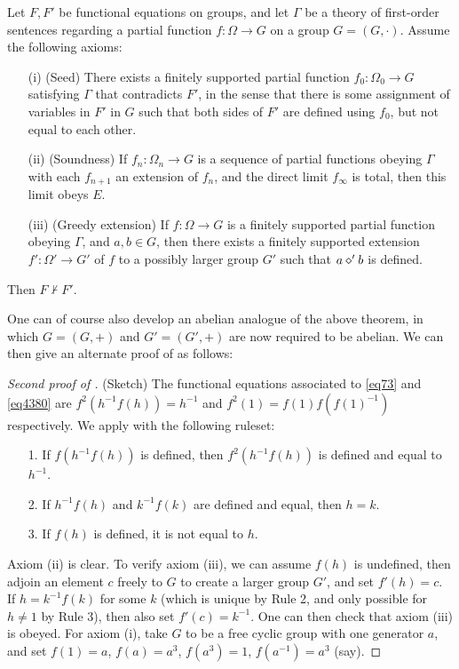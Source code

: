 \begin{theorem}\label{nc-greedy-abstract} Let $F,F'$ be functional equations on groups, and let $\Gamma$ be a theory of first-order sentences regarding a partial function $f \colon \Omega \to G$ on a group $G = (G,\cdot)$.  Assume the following axioms:
  \begin{itemize}
    \item[(i)] (Seed) There exists a finitely supported partial function $f_0 \colon \Omega_0 \to G$ satisfying $\Gamma$ that contradicts $F'$, in the sense that there is some assignment of variables in $F'$ in $G$ such that both sides of $F'$ are defined using $f_0$, but not equal to each other.
    \item[(ii)]  (Soundness)  If $f_n \colon \Omega_n \to G$ is a sequence of partial functions obeying $\Gamma$ with each $f_{n+1}$ an extension of $f_n$, and the direct limit $f_\infty$ is total, then this limit obeys $E$.
    \item[(iii)] (Greedy extension)  If $f \colon \Omega \to G$ is a finitely supported partial function obeying $\Gamma$, and $a,b \in G$, then there exists a finitely supported extension $f' \colon \Omega' \to G'$ of $f$ to a possibly larger group $G'$ such that $a \diamond' b$ is defined.
  \end{itemize}
  Then $F \not \vdash F'$.
\end{theorem}

One can of course also develop an abelian analogue of the above theorem, in which $G = (G,+)$ and $G' = (G',+)$ are now required to be abelian.  We can then give an alternate proof of  as follows:

\begin{proof}[Second proof of ] (Sketch)  The functional equations associated to \eqref{eq73} and \eqref{eq4380} are
$f^2(h^{-1} f(h)) =h^{-1}$ and $f^2(1) = f(1) f(f(1)^{-1})$ respectively.  We apply  with the following ruleset:
\begin{itemize}
  \item[1.]  If $f(h^{-1} f(h))$ is defined, then $f^2(h^{-1} f(h))$ is defined and equal to $h^{-1}$.
  \item[2.]  If $h^{-1} f(h)$ and $k^{-1} f(k)$ are defined and equal, then $h=k$.
  \item[3.]  If $f(h)$ is defined, it is not equal to $h$.
\end{itemize}
Axiom (ii) is clear.  To verify axiom (iii), we can assume $f(h)$ is undefined, then adjoin an element $c$ freely to $G$ to create a larger group $G'$, and set $f'(h) = c$.  If $h = k^{-1} f(k)$ for some $k$ (which is unique by Rule 2, and only possible for $h \neq 1$ by Rule 3), then also set $f'(c) = k^{-1}$.  One can then check that axiom (iii) is obeyed.  For axiom (i), take $G$ to be a free cyclic group with one generator $a$, and set $f(1) = a$, $f(a) = a^3$, $f(a^3) = 1$, $f(a^{-1}) = a^3$ (say).
\end{proof}

